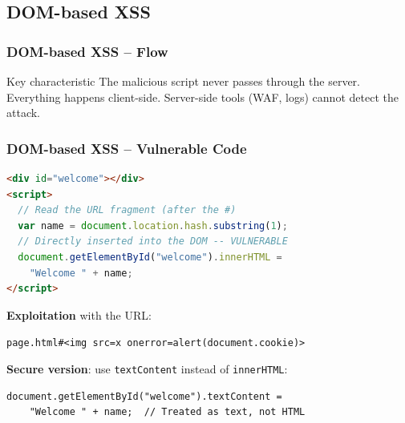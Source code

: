 \documentclass{beamer}
\def\emptyline{\vspace{10pt}}
\newcommand{\circled}[1]{\raisebox{.5pt}{\textcircled{\raisebox{-.9pt}{\scriptsize #1}}}}
\begin{document}
\subsection{DOM-based XSS}

\begin{frame}
\frametitle{DOM-based XSS -- Flow}

\begin{center}
\end{center}

\begin{alertblock}{Key characteristic}
The malicious script \alert{never passes through the server}. Everything happens client-side. Server-side tools (WAF, logs) cannot detect the attack.
\end{alertblock}
\end{frame}


\begin{frame}[fragile]
\frametitle{DOM-based XSS -- Vulnerable Code}

\begin{lstlisting}[language=HTML,title={\texttt{Vulnerable page using innerHTML}}]
<div id="welcome"></div>
<script>
  // Read the URL fragment (after the #)
  var name = document.location.hash.substring(1);
  // Directly inserted into the DOM -- VULNERABLE
  document.getElementById("welcome").innerHTML =
    "Welcome " + name;
</script>
\end{lstlisting}

\textbf{Exploitation} with the URL:
\begin{center}
\texttt{page.html\#<img src=x onerror=alert(document.cookie)>}
\end{center}

\emptyline
\textbf{Secure version}: use \texttt{textContent} instead of \texttt{innerHTML}:
\begin{lstlisting}[language=HTML,title={\texttt{Fix}}]
document.getElementById("welcome").textContent =
    "Welcome " + name;  // Treated as text, not HTML
\end{lstlisting}
\end{frame}
\end{document}
